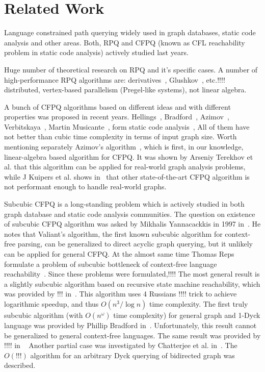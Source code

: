 \section{Related Work}

Language constrained path querying widely used in graph databases, static code analysis and other areas.
Both, RPQ and CFPQ (known as CFL reachability problem in static code analysis) actively studied last years.

Huge number of theoretical research on RPQ and it's specific cases.
A number of high-performance RPQ algorithms are: derivatives~\cite{10.1145/2949689.2949711}, Glushkov~\cite{Wang2019}, etc.!!!!~\cite{!!!} distributed, vertex-based parallelism (Pregel-like systems), not linear algebra.

A bunch of CFPQ algorithms based on different ideas and with different properties was proposed in recent years.
Hellings~\cite{hellingsRelational}, Bradford~\cite{8249039}, Azimov~\cite{Azimov:2018:CPQ:3210259.3210264}, Verbitskaya~\cite{10.1007/978-3-319-41579-6_22}, Martin Musicante~\cite{10.1007/978-3-319-91662-0_17,Medeiros:2018:EEC:3167132.3167265}, form static code analysis~\cite{!!!}, 
All of them have not better than cubic time complexity in terms of input graph size. 
Worth mentioning separately Azimov's algorithm~\cite{!!!}, which is first, in our knowledge, linear-algebra based algorithm for CFPQ. 
It was shown by Arseniy Terekhov et al.\cite{!!!} that this algorithm can be applied for real-world graph analysis problems, while J Kuipers et al. shows in~\cite{!!!} that other state-of-the-art CFPQ algorithm is not performant enough to handle real-world graphs.

Subcubic CFPQ is a long-standing problem which is actively studied in both graph database and static code analysis communities.
The question on existence of subcubic CFPQ algorithm was asked by Mikhalis Yannacackkis in 1997 in~\cite{!!!}. He notes that Valiant's algorithm, the first known subcubic algorithm for context-free parsing, can be generalized to direct acyclic graph querying, but it unlikely can be applied for general CFPQ. 
At the almost same time Thomas Reps formulate a problem of subcubic bottleneck of context-free language reachability~\cite{!!!}.
Since these problems were formulated,!!!!
The most general result is a slightly subcubic algorithm based on recursive state machine reachability, which was provided by !!! in~\cite{rsm:analysis:10.1007/3-540-44585-4_18}. This algorithm uses 4 Russians !!!! trick to achieve logarithmic speedup, and thus $O(n^3/\log{n})$ time complexity. 
The first truly subcubic algorithm (with $O(n^\omega)$ time complexity) for general graph and 1-Dyck language was provided by Phillip Bradford in~\cite{Bradford2017EfficientEP}. Unfortunately, this result cannot be generalized to general context-free languages.
The same result was provided by !!!! in ~\cite{zhang2020conditional,pavlogiannis2020finegrained}
Another partial case was investigated by Chatterjee et al. in~\cite{10.1145/3158118}.
The $O(!!!)$ algorithm for an arbitrary Dyck querying of bidirected graph was described.

